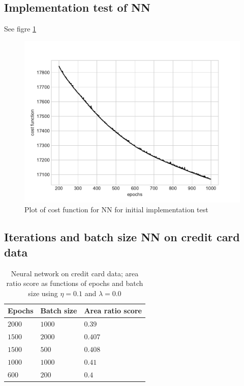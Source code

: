 \documentclass[%
oneside,                 %
final,                   %
10pt]{article}
\begin{document}
\begin{appendices}
\subsection*{Implementation test of NN}
See figre \ref{fig:NN_cost_initial}
\begin{figure}[!h]
        \centering 
         \includegraphics[scale=0.5]{../Results/CC_NN_initial/cost_NN.pdf} 
        \caption{Plot of cost function for NN for initial implementation test }
        \label{fig:NN_cost_initial}   
\end{figure}  

\subsection*{Iterations and batch size NN on credit card data}
\begin{table}[h!]
\begin{center}
\begin{tabular}{lll}
\hline
 Epochs  & Batch size & Area ratio score   \\
\hline
$2000$ & $1000$ &
$0.39$ \\
$1500$ & $2000$ &
$0.407$ \\
$1500$ & $500$ & 
$0.408$ \\
$1000$ & $1000$ &
$0.41$ \\
$600$ & $200$& 
$0.4$\\
\hline
\end{tabular}
\end{center}
\caption{Neural network on credit card data; area ratio score as functions of epochs and batch size using $\eta=0.1$ and $\lambda=0.0$}
\label{table:NN_epochs_batches}
\end{table}
\end{appendices}
\end{document}
